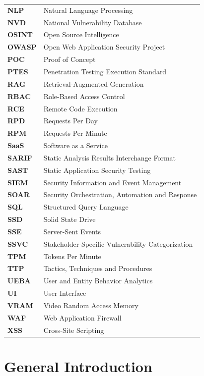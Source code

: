 \documentclass[12pt,a4paper]{report}
\begin{document}
\begin{longtable}{>{\bfseries}p{3.5cm} p{10.5cm}}
NLP         & Natural Language Processing \\
NVD         & National Vulnerability Database \\
OSINT       & Open Source Intelligence \\
OWASP       & Open Web Application Security Project \\
POC         & Proof of Concept \\
PTES        & Penetration Testing Execution Standard \\
RAG         & Retrieval-Augmented Generation \\
RBAC        & Role-Based Access Control \\
RCE         & Remote Code Execution \\
RPD         & Requests Per Day \\
RPM         & Requests Per Minute \\
SaaS        & Software as a Service \\
SARIF       & Static Analysis Results Interchange Format \\
SAST        & Static Application Security Testing \\
SIEM        & Security Information and Event Management \\
SOAR        & Security Orchestration, Automation and Response \\
SQL         & Structured Query Language \\
SSD         & Solid State Drive \\
SSE         & Server-Sent Events \\
SSVC        & Stakeholder-Specific Vulnerability Categorization \\
TPM         & Tokens Per Minute \\
TTP         & Tactics, Techniques and Procedures \\
UEBA        & User and Entity Behavior Analytics \\
UI          & User Interface \\
VRAM        & Video Random Access Memory \\
WAF         & Web Application Firewall \\
XSS         & Cross-Site Scripting \\
\bottomrule
\end{longtable}

\newpage
{}
\setcounter{page}{1}
\thispagestyle{fancy}
\chapter*{General Introduction}
\end{document}
